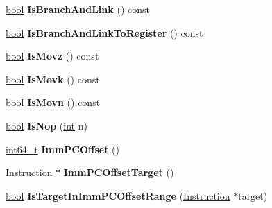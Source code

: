 \begin{DoxyCompactItemize}
\mbox{\hyperlink{classbool}{bool}} {\bfseries Is\+Branch\+And\+Link} () const
\item 
\mbox{\label{classv8_1_1internal_1_1Instruction_a7a38aef5908ad05d5ad5b44092d6e4d5}} 
\mbox{\hyperlink{classbool}{bool}} {\bfseries Is\+Branch\+And\+Link\+To\+Register} () const
\item 
\mbox{\label{classv8_1_1internal_1_1Instruction_ae1db54368b2a350c1c8f75fc30199013}} 
\mbox{\hyperlink{classbool}{bool}} {\bfseries Is\+Movz} () const
\item 
\mbox{\label{classv8_1_1internal_1_1Instruction_afa07d9a4f43868f33aca4015548e6e2f}} 
\mbox{\hyperlink{classbool}{bool}} {\bfseries Is\+Movk} () const
\item 
\mbox{\label{classv8_1_1internal_1_1Instruction_a5af7799c242f7d99a8092a1b05efda4c}} 
\mbox{\hyperlink{classbool}{bool}} {\bfseries Is\+Movn} () const
\item 
\mbox{\label{classv8_1_1internal_1_1Instruction_aedf8d12166333dd1f9349ecb75bb1d80}} 
\mbox{\hyperlink{classbool}{bool}} {\bfseries Is\+Nop} (\mbox{\hyperlink{classint}{int}} n)
\item 
\mbox{\label{classv8_1_1internal_1_1Instruction_ac03c28a2beead9a6485eda3a7be877df}} 
\mbox{\hyperlink{classint64__t}{int64\+\_\+t}} {\bfseries Imm\+P\+C\+Offset} ()
\item 
\mbox{\label{classv8_1_1internal_1_1Instruction_aa6970868d0bc53ee29bc74958465a9b8}} 
\mbox{\hyperlink{classv8_1_1internal_1_1Instruction}{Instruction}} $\ast$ {\bfseries Imm\+P\+C\+Offset\+Target} ()
\item 
\mbox{\label{classv8_1_1internal_1_1Instruction_aa9f1e2021ca9a491f9ed61aa0f02138d}} 
\mbox{\hyperlink{classbool}{bool}} {\bfseries Is\+Target\+In\+Imm\+P\+C\+Offset\+Range} (\mbox{\hyperlink{classv8_1_1internal_1_1Instruction}{Instruction}} $\ast$target)
\item 
\mbox{\label{classv8_1_1internal_1_1Instruction_a6a4deb93e3cc63f9a98b8ecee5375ff1}} 

\end{DoxyCompactItemize}
